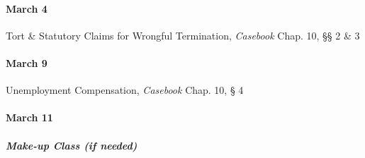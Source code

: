 \documentclass[11pt,letterpaper,twoside]{article}
\begin{document}
\paragraph{March 4}\label{march-4}

Tort \& Statutory Claims for Wrongful Termination, \emph{Casebook} Chap.
10, §§ 2 \& 3

\paragraph{March 9}\label{march-9}

Unemployment Compensation, \emph{Casebook} Chap. 10, § 4

\paragraph{March 11}\label{march-11}

\subparagraph{Make-up Class (if needed)}\label{make-up-class-if-needed}
\end{document}
